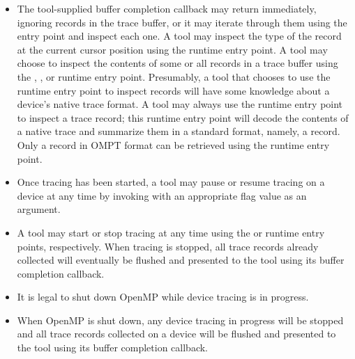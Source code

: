 \begin{itemize}
\item The tool-supplied buffer completion callback may return
  immediately, ignoring records in the trace buffer, or it may iterate
  through them using the  entry
  point
  and inspect each one. A tool may inspect the type of the record at
  the current cursor position using the 
  runtime entry point.  A tool may choose to inspect the contents of some or
  all records in a trace buffer using the ,
  , or
   runtime entry point.  Presumably, a tool that
  chooses to use the  runtime entry point to
  inspect records will have some knowledge about a device's native
  trace format.  A tool may always use the
   runtime entry point to inspect a trace
  record; this runtime entry point will decode the contents of a native trace
  and summarize them in a standard format, namely, a
   record.
  Only a record in OMPT format can be retrieved using the
   runtime entry point.
\item Once tracing has been started, a tool may pause or resume
  tracing on a device at any time by invoking
   with an appropriate flag value as an
  argument.  
\item A tool may start or stop tracing at any time using the 
   or  runtime entry points,
  respectively. When tracing is stopped, all trace records already
  collected will eventually be flushed and presented to the tool using
  its buffer completion callback.
\item It is legal to shut down OpenMP while device tracing 
is in progress.  
\item When OpenMP is shut down, any device tracing in progress will be
  stopped and all trace records collected on a device will be flushed
  and presented to the tool using its buffer completion callback.
\end{itemize}


